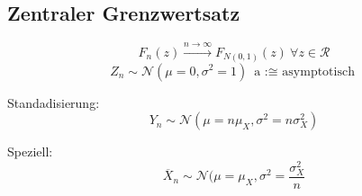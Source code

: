 \documentclass[10pt,a4paper,landscape]{article}
\begin{document}
\begin{multicols}{4}
\subsection{Zentraler Grenzwertsatz}
\[
F_n(z) \xrightarrow{n \to \infty} F_{N(0,1)}(z) ~ \forall z \in \mathcal{R}
\]
\[
Z_n \sim \mathcal{N}(\mu = 0, \sigma^2 = 1) ~ \text{a :$\cong$ asymptotisch}
\]

Standadisierung:
\[
Y_n \sim \mathcal{N}(\mu = n\mu_X, \sigma^2= n \sigma_X^2)
\]

Speziell:
\[
\overline{X}_n \sim \mathcal{N}(\mu = \mu_X, \sigma^2=\frac{\sigma_X^2}{n}
\]

\end{multicols}
\end{document}
